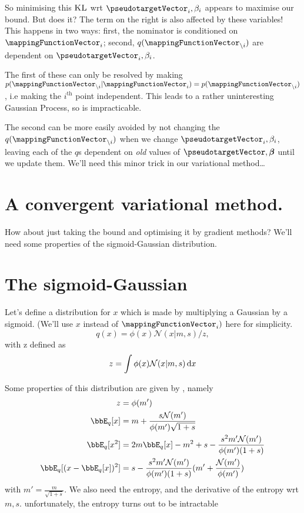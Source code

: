 \documentclass{article} %
\newcommand{\noti}{{\backslash i}}
\renewcommand{\d}{\,\text d}
\begin{document}
So minimising this $\textsc{KL}$  wrt $\pseudotargetVector_i, \beta_i$ appears to maximise our bound. But does it? The term on the right is also affected by these variables! This happens in two ways: first, the nominator is conditioned on $\mappingFunctionVector_i$; second, $q(\mappingFunctionVector_\noti)$ are dependent on $\pseudotargetVector_i, \beta_i$. 

The first of these can only be resolved by making $p(\mappingFunctionVector_\noti|\mappingFunctionVector_i) = p(\mappingFunctionVector_\noti)$, i.e making the $i^\text{th}$ point independent. This leads to a rather uninteresting Gaussian Process, so is impracticable.  

The second can be more easily avoided by not changing the $q(\mappingFunctionVector_\noti)$ when we change $\pseudotargetVector_i, \beta_i$, leaving each of the $q$s dependent on {\em old} values of $\pseudotargetVector, \boldsymbol \beta$ until we update them. We'll need this minor trick in our variational method\ldots

\section{A convergent variational method. }
How about just taking the bound and optimising it by gradient methods? We'll need some properties of the sigmoid-Gaussian distribution.

\section{The sigmoid-Gaussian}
Let's define a distribution for $x$ which is made by multiplying a Gaussian by a sigmoid. (We'll use $x$ instead of $\mappingFunctionVector_i)$ here for simplicity. 
$$q(x) = \phi(x)\mathcal N(x | m, s)/z,$$
with z defined as 
$$z = \int \phi(x)\mathcal N(x | m, s) \d x$$

Some properties of this distribution are given by \cite{rasmussen2006gaussian}, namely
\begin{equation*}
	\begin{split}
		z &= \phi(m')\\
		\bbE_q[x] &= m + \frac{s \mathcal N(m')}{\phi(m')\sqrt{1+s}}\\
		\bbE_q[x^2] &= 2m\bbE_q[x] - m^2 + s - \frac{s^2 m' \mathcal N(m')}{\phi(m')(1+s)}\\
		\bbE_q[(x-\bbE_q[x])^2] &= s - \frac{s^2 m' \mathcal N(m')}{\phi(m')(1+s)}(m' + \frac{\mathcal N(m')}{\phi(m')})
	\end{split}
\end{equation*}
with $m' = \frac{m}{\sqrt{1+s}}$. We also need the entropy, and the derivative of the entropy wrt $m,s$. unfortunately, the entropy turns out to be intractable
\end{document}
